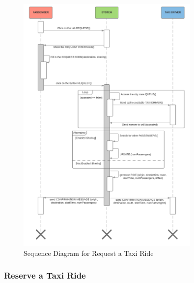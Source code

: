 \begin{figure}[htbp]
\centering
\includegraphics[width=0.8\textwidth]{cpt/img/SequenceRequest}
\caption{Sequence Diagram for Request a Taxi Ride }
\end{figure}
\clearpage

\subsubsection{Reserve a Taxi Ride}

